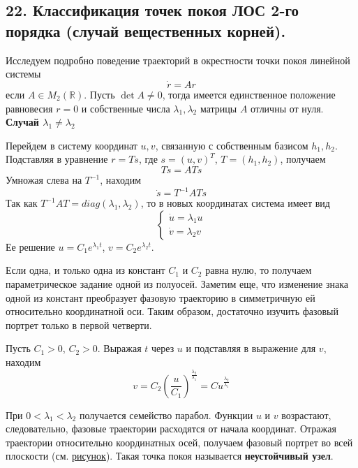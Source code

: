\subsection*{22. Классификация точек покоя ЛОС 2-го порядка (случай вещественных корней).}

Исследуем подробно поведение траекторий в окрестности точки покоя линейной системы
\begin{equation*}
    \dot{r} = Ar
\end{equation*}
если $A \in M_2(\mathbb{R})$. Пусть $\det A \neq 0$, тогда имеется единственное положение равновесия $r = 0$ и собственные числа $\lambda_1, \lambda_2$ матрицы $A$ отличны от нуля.\\

\noindent \textbf{Случай $\lambda_1 \neq \lambda_2$}

Перейдем в систему координат $u, v$, связанную с собственным базисом $h_1, h_2$. Подставляя в уравнение $r = Ts$, где $s = (u, v)^T$, $T = (h_1, h_2)$, получаем
\begin{equation*}
    T\dot{s} = ATs
\end{equation*}
Умножая слева на $T^{-1}$, находим
\begin{equation*}
    \dot{s} = T^{-1}ATs
\end{equation*}
Так как $T^{-1}AT = diag(\lambda_1, \lambda_2)$, то в новых координатах система имеет вид
\begin{equation*}
    \begin{cases}
        \dot{u} = \lambda_1 u \\
        \dot{v} = \lambda_2 v
    \end{cases}
\end{equation*}
Ее решение $u = C_1e^{\lambda_1 t}$, $v = C_2e^{\lambda_2 t}$.

Если одна, и только одна из констант $C_1$ и $C_2$ равна нулю, то получаем параметрическое задание одной из полуосей. Заметим еще, что изменение знака одной из констант преобразует фазовую траекторию в симметричную ей относительно координатной оси. Таким образом, достаточно изучить фазовый портрет только в первой четверти.

Пусть $C_1 > 0$, $C_2 > 0$. Выражая $t$ через $u$ и подставляя в выражение для $v$, находим
\begin{equation*}
    v = C_2\left(\frac{u}{C_1} \right)^{\frac{\lambda_2}{\lambda_1}} = Cu^{\frac{\lambda_2}{\lambda_1}}
\end{equation*}

При $0 < \lambda_1 < \lambda_2$ получается семейство парабол. Функции $u$ и $v$ возрастают, следовательно, фазовые траектории расходятся от начала координат. Отражая траектории относительно координатных осей, получаем фазовый портрет во всей плоскости (см. \hyperref[neustuzel]{рисунок}). Такая точка покоя называется \textbf{неустойчивый узел}.

